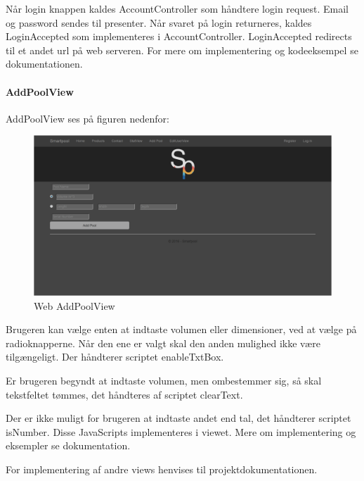 Når login knappen kaldes AccountController som håndtere login request. Email og password sendes til presenter. Når svaret på login returneres, kaldes LoginAccepted som implementeres i AccountController. LoginAccepted redirects til et andet url på web serveren. For mere om implementering og kodeeksempel se dokumentationen.

\paragraph{AddPoolView}
AddPoolView ses på figuren nedenfor:

\begin{figure}
	\centering
	\includegraphics[width=1.0\linewidth]{figs/implementering/web_addpoolview}
	\caption{Web AddPoolView}
	\label{fig:webaddpoolview}
\end{figure}

Brugeren kan vælge enten at indtaste volumen eller dimensioner, ved at vælge på radioknapperne. Når den ene er valgt skal den anden mulighed ikke være tilgængeligt. Der håndterer scriptet enableTxtBox. 

Er brugeren begyndt at indtaste volumen, men ombestemmer sig, så skal tekstfeltet tømmes, det håndteres af scriptet clearText. 

Der er ikke muligt for brugeren at indtaste andet end tal, det håndterer scriptet isNumber. Disse JavaScripts implementeres i viewet. Mere om implementering og eksempler se dokumentation.

For implementering af andre views henvises til projektdokumentationen. 